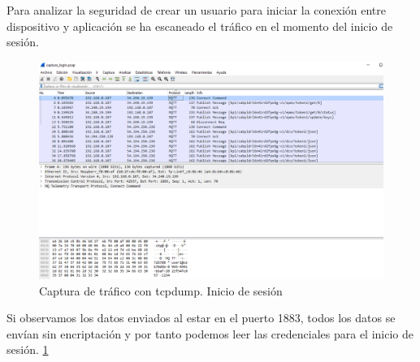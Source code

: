 Para analizar la seguridad de crear un usuario para iniciar la conexión entre dispositivo y aplicación se ha escaneado el tráfico en el momento del inicio de sesión. \\

\begin{figure}[p]
    \centering
    \includegraphics[width=\linewidth]{imagenes/Captura de pantalla 2022-06-26 190942.png}
    \caption{Captura de tráfico con tcpdump. Inicio de sesión}
    \label{fig:figure23-prueba}
\end{figure}

Si observamos los datos enviados al estar en el puerto 1883, todos los datos se envían sin encriptación y por tanto podemos leer las credenciales para el inicio de sesión. \ref{fig:figure23-prueba}